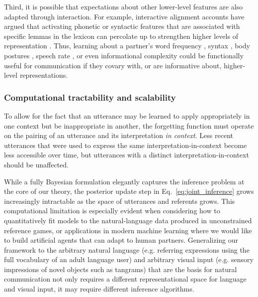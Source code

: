 Third, it is possible that expectations about other lower-level features are also adapted through interaction.
For example, interactive alignment accounts \cite{pickering2004toward} have argued that activating phonetic or syntactic features that are associated with specific lemmas in the lexicon can percolate up to strengthen higher levels of representation \cite{roelofs1992spreading,pickering1998representation}.
Thus, learning about a partner's word frequency \cite{louwerse2012behavior}, syntax \cite{gruberg2019syntactic,levelt1982surface}, body postures \cite{lakin2003using}, speech rate \cite{giles1991contexts}, or even informational complexity \cite{abney2014complexity} could be functionally useful for communication if they covary with, or are informative about, higher-level representations. 



\subsubsection{Computational tractability and scalability}
To allow for the fact that an utterance may be learned to apply appropriately in one context but be inappropriate in another, the forgetting function must operate on the pairing of an utterance and its interpretation \textit{in context}.
Less recent utterances that were used to express the same interpretation-in-context  become less accessible over time, but utterances with a distinct interpretation-in-context should be unaffected. 

While a fully Bayesian formulation elegantly captures the inference problem at the core of our theory, the posterior update step in Eq.~\ref{eq:joint_inference} grows increasingly intractable as the space of utterances and referents grows. 
This computational limitation is especially evident when considering how to quantitatively fit models to the natural-language data produced in unconstrained reference games, or applications in modern machine learning where we would like to build artificial agents that can adapt to human partners.
Generalizing our framework to the arbitrary natural language (e.g. referring expressions using the full vocabulary of an adult language user) and arbitrary visual input (e.g. sensory impressions of novel objects such as tangrams) that are the basis for natural communication not only requires a different representational space for language and visual input, it may require different inference algorithms. 

